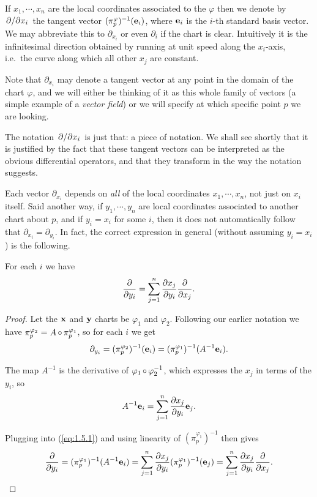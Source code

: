 \documentclass[a4paper,11pt]{article}
\begin{document}
	\begin{defi}
		If $x_1 , \cdots, x_n$ are the local coordinates associated to the $\varphi$ then we denote by $\pdv*{x_i}$ the tangent vector $(\pi_p^\varphi)^{-1} (\vb e_i)$, where $\vb e_i$ is the $i$-th standard basis vector. We may abbreviate this to $\partial_{x_i}$ or even $\partial_i$ if the chart is clear. Intuitively it is the infinitesimal direction obtained by running at unit speed along the $x_i$-axis, i.e.\ the curve along which all other $x_j$ are constant.
	\end{defi}

	Note that $\partial_{x_i}$ may denote a tangent vector at any point in the domain of the chart $\varphi$, and we will either be thinking of it as this whole family of vectors (a simple example of a \emph{vector field}) or we will specify at which specific point $p$ we are looking.
	

	\begin{rmk}
		The notation $\pdv*{x_i}$ is just that: a piece of notation. We shall see shortly that it is justified by the fact that these tangent vectors can be interpreted as the obvious differential operators, and that they transform in the way the notation suggests.
	\end{rmk}

	Each vector $\partial_{x_i}$ depends on \emph{all} of the local coordinates $x_1, \cdots, x_n$, not just on $x_i$ itself. Said another way, if $y_1, \cdots, y_n$ are local coordinates associated to another chart about $p$, and if $y_i = x_i$ for some $i$, then it does not automatically follow that $\partial_{x_i} = \partial_{y_i}$. In fact, the correct expression in general (without assuming $y_i = x_i$) is the following.

	\begin{lem}
		For each $i$ we have
		\[
			\pdv{y_i} = \sum_{j = 1}^n \pdv{x_j}{y_i} \pdv{x_j}.
		\]
	\end{lem}
	\begin{proof}
		Let the $\vb x$ and $\vb y$ charts be $\varphi_1$ and $\varphi_2$. Following our earlier notation we have $\pi_p^{\varphi_2} = A \operatorname{\circ} \pi_p^{\varphi_1}$, so for each $i$ we get
		\begin{equation}
			\partial_{y_i} = (\pi_p^{\varphi_2})^{-1}(\vb e_i) = (\pi_p^{\varphi_1})^{-1} (A^{-1} \vb e_i).
			\label{eq:1.5.1}
		\end{equation} 

		The map $A^{-1}$ is the derivative of $\varphi_1 \operatorname{\circ} \varphi_2^{-1}$, which expresses the $x_j$ in terms of the $y_i$, so
		\[
			A^{-1} \vb e_i = \sum_{j=1}^n \pdv{x_j}{y_i} \vb e_j.
		\]
		
		Plugging into (\ref{eq:1.5.1}) and using linearity of $(\pi_p^{\varphi_1})^{-1}$ then gives
		\[
			\pdv{y_i} = (\pi_p^{\varphi_1})^{-1} (A^{-1} \vb e_i) = \sum_{j=1}^n \pdv{x_j}{y_i}\/(\pi_p^{\varphi_1})^{-1} (\vb e_j) = \sum_{j=1}^n \pdv{x_j}{y_i}\pdv{x_j}.
		\]
	\end{proof}
\end{document}
